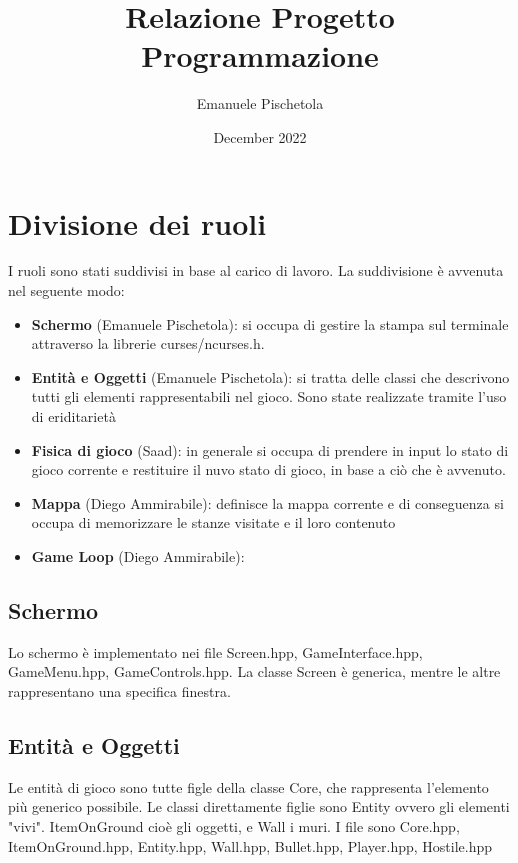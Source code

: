 \documentclass{article}
\title{Relazione Progetto Programmazione}
\author{Emanuele Pischetola}
\date{December 2022}
\begin{document}
\maketitle

\section{Divisione dei ruoli}
I ruoli sono stati suddivisi in base al carico di lavoro.
La suddivisione è avvenuta nel seguente modo:
\begin{itemize}
\item \textbf{Schermo} (Emanuele Pischetola): si occupa di gestire la stampa sul terminale attraverso la librerie curses/ncurses.h.
\item \textbf{Entità e Oggetti} (Emanuele Pischetola): si tratta delle classi che descrivono tutti gli elementi rappresentabili nel gioco. Sono state realizzate tramite l'uso di eriditarietà
\item \textbf{Fisica di gioco} (Saad): in generale si occupa di prendere in input lo stato di gioco corrente e restituire il nuvo stato di gioco, in base a ciò che è avvenuto.
\item \textbf{Mappa} (Diego Ammirabile): definisce la mappa corrente e di conseguenza si occupa di memorizzare le stanze visitate e il loro contenuto
\item \textbf{Game Loop} (Diego Ammirabile): %
\end{itemize}

\subsection{Schermo}
Lo schermo è implementato nei file Screen.hpp, GameInterface.hpp, GameMenu.hpp, GameControls.hpp. La classe Screen è generica, mentre le altre rappresentano una specifica finestra.
\subsection{Entità e Oggetti}
Le entità di gioco sono tutte figle della classe Core, che rappresenta l'elemento più generico possibile. Le classi direttamente figlie sono Entity ovvero gli elementi "vivi".
ItemOnGround cioè gli oggetti, e Wall i muri. I file sono Core.hpp, ItemOnGround.hpp, Entity.hpp, Wall.hpp, Bullet.hpp, Player.hpp, Hostile.hpp
\end{document}
